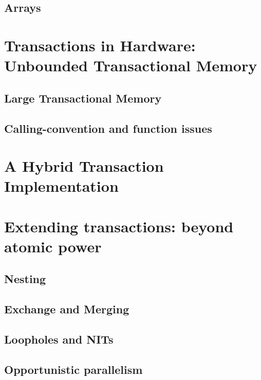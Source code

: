 \documentclass{phd-thesis}
\begin{document}
\section{Arrays}


\chapter[Transactions in Hardware]{Transactions in Hardware: Unbounded Transactional Memory}

\section{Large Transactional Memory}
\section{Calling-convention and function issues}

\chapter{A Hybrid Transaction Implementation}\label{cha:hybrid}


\chapter[Extending transactions]{Extending transactions: beyond atomic power}

\section{Nesting}
\section{Exchange and Merging}
\section{Loopholes and NITs}
\section{Opportunistic parallelism}
\end{document}

